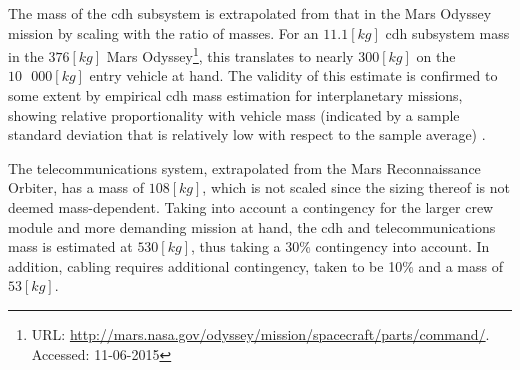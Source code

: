 The mass of the \gls{cdh} subsystem is extrapolated from that in the Mars Odyssey mission by scaling with the ratio of masses. For an $11.1 \left[kg\right]$ \gls{cdh} subsystem mass in the $376 \left[kg\right]$ Mars Odyssey\footnote{URL: \url{http://mars.nasa.gov/odyssey/mission/spacecraft/parts/command/}. Accessed: 11-06-2015}, this translates to nearly $300 \left[kg\right]$ on the $10\mbox{ }000 \left[kg\right]$ entry vehicle at hand. The validity of this estimate is confirmed to some extent by empirical \gls{cdh} mass estimation for interplanetary missions, showing relative proportionality with vehicle mass (indicated by a sample standard deviation that is relatively low with respect to the sample average) \cite[p.953]{Wertz2011}.

The telecommunications system, extrapolated from the Mars Reconnaissance Orbiter, has a mass of $108\left[kg\right]$, which is not scaled since the sizing thereof is not deemed mass-dependent. Taking into account a contingency for the larger crew module and more demanding mission at hand, the \gls{cdh} and telecommunications mass is estimated at $530 \left[kg\right]$, thus taking a 30\% contingency into account. In addition, cabling requires additional contingency, taken to be 10\% and a mass of $53 \left[kg\right]$.